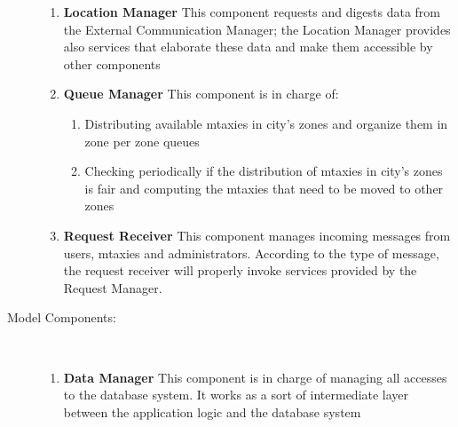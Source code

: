 \documentclass[11pt,titlepage]{article} %
\begin{document}
\begin{description}
\begin{enumerate}
		        \item \textbf{Location Manager}
		            \newline This component requests and digests data from the External Communication Manager; the Location Manager
		            provides also services that elaborate these data and make them accessible by other components
		
		        \item \textbf{Queue Manager}
		            \newline This component is in charge of:
			  \begin{enumerate}
			            \item Distributing available mtaxies in city's zones and organize them in zone per zone queues
			            \item Checking periodically if the distribution of mtaxies in city's zones is fair and computing the mtaxies
			            that need to be moved to other zones
			 \end{enumerate}
		        \item \textbf {Request Receiver}
		            \newline This component manages incoming messages from users, mtaxies and administrators.
		            According to the type of message, the request receiver will properly invoke services provided by the Request Manager.
		\end{enumerate}
	
	      \item [Model Components:] \hfill \\
		\begin{enumerate}
		        \item \textbf{Data Manager}
		            \newline This component is in charge of managing all accesses to the database system. It works as a sort of
		            intermediate layer between the application logic and the database system
		\end{enumerate}
	

\end{description}
\end{document}
